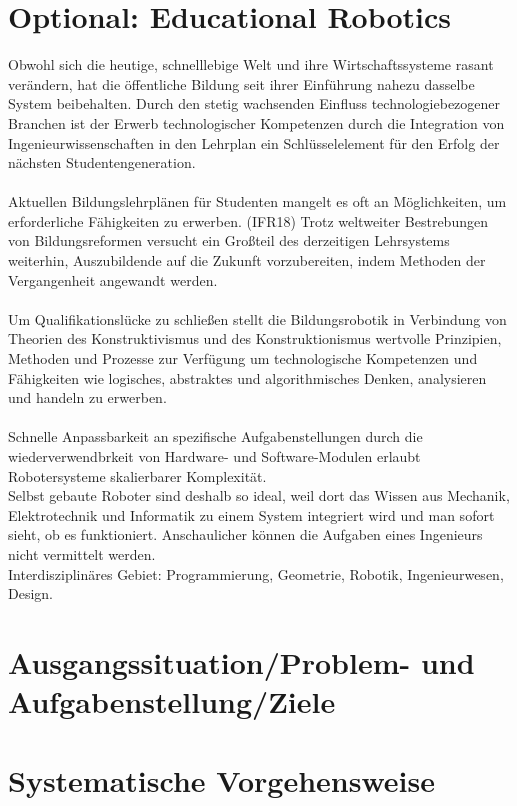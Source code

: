 \documentclass[Bachelor, BMR, ngerman]{twbook}
\begin{document}
\chapter{Optional: Educational Robotics}

    Obwohl sich die heutige, schnelllebige Welt und ihre Wirtschaftssysteme rasant verändern, hat die öffentliche Bildung seit ihrer Einführung nahezu dasselbe System beibehalten. Durch den stetig wachsenden Einfluss technologiebezogener Branchen ist der Erwerb technologischer Kompetenzen durch die Integration von Ingenieurwissenschaften in den Lehrplan ein Schlüsselelement für den Erfolg der nächsten Studentengeneration. \cite{Eg14}\\
    \\
    Aktuellen Bildungslehrplänen für Studenten mangelt es oft an Möglichkeiten, um erforderliche Fähigkeiten zu erwerben. (IFR18) Trotz weltweiter Bestrebungen von Bildungsreformen versucht ein Großteil des derzeitigen Lehrsystems weiterhin, Auszubildende auf die Zukunft vorzubereiten, indem Methoden der Vergangenheit angewandt werden. \cite{Eg14}\\
    \\
    Um Qualifikationslücke zu schließen stellt die Bildungsrobotik in Verbindung von Theorien des Konstruktivismus und des Konstruktionismus wertvolle Prinzipien, Methoden und Prozesse zur Verfügung um technologische Kompetenzen und Fähigkeiten wie logisches, abstraktes und algorithmisches \cite{Eg16} Denken, analysieren und handeln zu erwerben. \cite{ToLa16}\\
    \\
    Schnelle Anpassbarkeit an spezifische Aufgabenstellungen durch die wiederverwendbrkeit von Hardware- und Software-Modulen erlaubt Robotersysteme skalierbarer Komplexität.\\
    Selbst gebaute Roboter sind deshalb so ideal, weil dort das Wissen aus Mechanik, Elektrotechnik und Informatik zu einem System integriert wird und man sofort sieht, ob es funktioniert. Anschaulicher können die Aufgaben eines Ingenieurs nicht vermittelt werden.\\
    Interdisziplinäres Gebiet: Programmierung, Geometrie, Robotik, Ingenieurwesen, Design.

\chapter{Ausgangssituation/Problem- und Aufgabenstellung/Ziele}
\chapter{Systematische Vorgehensweise}
\end{document}
